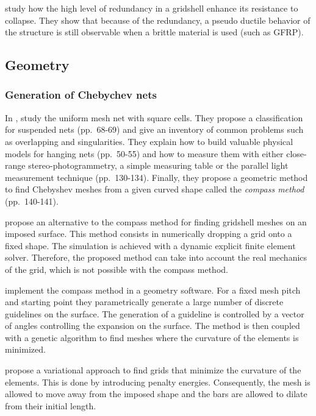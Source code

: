 \citet{Tayeb2013} study how the high level of redundancy in a gridshell enhance its resistance to collapse. They show that because of the redundancy, a pseudo ductile behavior of the structure is still observable when a brittle material is used (such as GFRP).

\subsection{Geometry}

\subsubsection{Generation of Chebychev nets}

In ,  study the uniform mesh net with square cells. They propose a classification for suspended nets (pp.~68-69) and give an inventory of common problems such as overlapping and singularities. They explain how to build valuable physical models for hanging nets (pp.~50-55) and how to measure them with either close-range stereo-photogrammetry, a simple measuring table or the parallel light measurement technique (pp.~130-134). Finally, they propose a geometric method to find Chebyshev meshes from a given curved shape called the \emph{compass method} (pp.~140-141).

 propose an alternative to the compass method for finding gridshell meshes on an imposed surface. This method consists in numerically dropping a grid onto a fixed shape. The simulation is achieved with a dynamic explicit finite element solver. Therefore, the proposed method can take into account the real mechanics of the grid, which is not possible with the compass method.

 implement the compass method in a geometry software. For a fixed mesh pitch and starting point they parametrically generate a large number of discrete guidelines on the surface. The generation of a guideline is controlled by a vector of angles controlling the expansion on the surface. The method is then coupled with a genetic algorithm to find meshes where the curvature of the elements is minimized.

 propose a variational approach to find grids that minimize the curvature of the elements. This is done by introducing penalty energies. Consequently, the mesh is allowed to move away from the imposed shape and the bars are allowed to dilate from their initial length.

